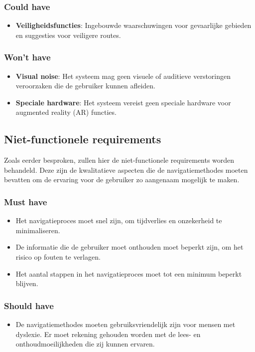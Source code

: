 \subsubsection{Could have}
\begin{itemize}
    \item \textbf{Veiligheidsfuncties}: Ingebouwde waarschuwingen voor gevaarlijke gebieden en suggesties voor veiligere routes.
\end{itemize}

\subsubsection{Won't have}
\begin{itemize}
    \item \textbf{Visual noise}: Het systeem mag geen visuele of auditieve verstoringen veroorzaken die de gebruiker kunnen afleiden.
    \item \textbf{Speciale hardware}: Het systeem vereist geen speciale hardware voor augmented reality (AR) functies.
\end{itemize}

\subsection{Niet-functionele requirements}
\label{sec:niet-functionele-requirements}


Zoals eerder besproken, zullen hier de niet-functionele requirements worden behandeld. Deze zijn de kwalitatieve aspecten die de navigatiemethodes moeten bevatten om de ervaring voor de gebruiker zo aangenaam mogelijk te maken.

\subsubsection{Must have}
\begin{itemize}
    \item Het navigatieproces moet snel zijn, om tijdverlies en onzekerheid te minimaliseren.
    \item De informatie die de gebruiker moet onthouden moet beperkt zijn, om het risico op fouten te verlagen.
    \item Het aantal stappen in het navigatieproces moet tot een minimum beperkt blijven.
\end{itemize}

\subsubsection{Should have}
\begin{itemize}
    \item De navigatiemethodes moeten gebruiksvriendelijk zijn voor mensen met dyslexie. Er moet rekening gehouden worden met de lees- en onthoudmoeilijkheden die zij kunnen ervaren.
\end{itemize}

